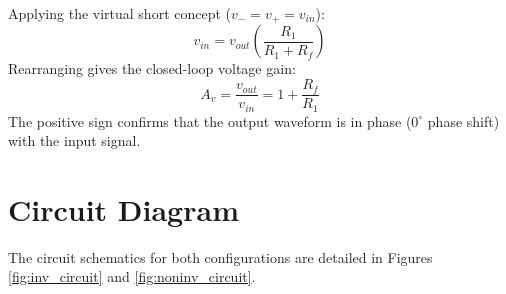Applying the virtual short concept ($v_- = v_+ = v_{in}$):
\begin{equation}
	v_{in} = v_{out} \left( \frac{R_1}{R_1 + R_f} \right)
\end{equation}
Rearranging gives the closed-loop voltage gain:
\begin{equation}
	A_v = \frac{v_{out}}{v_{in}} = 1 + \frac{R_f}{R_1}
\end{equation}
The positive sign confirms that the output waveform is in phase ($0^\circ$ phase shift) with the input signal.

%


\section{Circuit Diagram}
The circuit schematics for both configurations are detailed in Figures \ref{fig:inv_circuit} and \ref{fig:noninv_circuit}.

